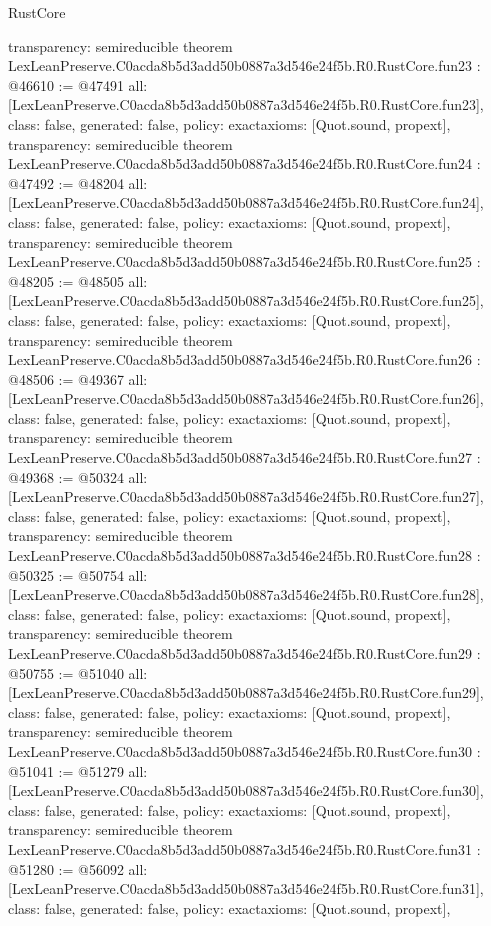 \begin{lexlean}{RustCore}
\begin{coremodule}
{  transparency: semireducible
}
theorem LexLeanPreserve.C0acda8b5d3add50b0887a3d546e24f5b.R0.RustCore.fun23 : @46610 := @47491 {
  all: [LexLeanPreserve.C0acda8b5d3add50b0887a3d546e24f5b.R0.RustCore.fun23],
  class: false,
  generated: false,
  policy: exact{axioms: [Quot.sound, propext]},
  transparency: semireducible
}
theorem LexLeanPreserve.C0acda8b5d3add50b0887a3d546e24f5b.R0.RustCore.fun24 : @47492 := @48204 {
  all: [LexLeanPreserve.C0acda8b5d3add50b0887a3d546e24f5b.R0.RustCore.fun24],
  class: false,
  generated: false,
  policy: exact{axioms: [Quot.sound, propext]},
  transparency: semireducible
}
theorem LexLeanPreserve.C0acda8b5d3add50b0887a3d546e24f5b.R0.RustCore.fun25 : @48205 := @48505 {
  all: [LexLeanPreserve.C0acda8b5d3add50b0887a3d546e24f5b.R0.RustCore.fun25],
  class: false,
  generated: false,
  policy: exact{axioms: [Quot.sound, propext]},
  transparency: semireducible
}
theorem LexLeanPreserve.C0acda8b5d3add50b0887a3d546e24f5b.R0.RustCore.fun26 : @48506 := @49367 {
  all: [LexLeanPreserve.C0acda8b5d3add50b0887a3d546e24f5b.R0.RustCore.fun26],
  class: false,
  generated: false,
  policy: exact{axioms: [Quot.sound, propext]},
  transparency: semireducible
}
theorem LexLeanPreserve.C0acda8b5d3add50b0887a3d546e24f5b.R0.RustCore.fun27 : @49368 := @50324 {
  all: [LexLeanPreserve.C0acda8b5d3add50b0887a3d546e24f5b.R0.RustCore.fun27],
  class: false,
  generated: false,
  policy: exact{axioms: [Quot.sound, propext]},
  transparency: semireducible
}
theorem LexLeanPreserve.C0acda8b5d3add50b0887a3d546e24f5b.R0.RustCore.fun28 : @50325 := @50754 {
  all: [LexLeanPreserve.C0acda8b5d3add50b0887a3d546e24f5b.R0.RustCore.fun28],
  class: false,
  generated: false,
  policy: exact{axioms: [Quot.sound, propext]},
  transparency: semireducible
}
theorem LexLeanPreserve.C0acda8b5d3add50b0887a3d546e24f5b.R0.RustCore.fun29 : @50755 := @51040 {
  all: [LexLeanPreserve.C0acda8b5d3add50b0887a3d546e24f5b.R0.RustCore.fun29],
  class: false,
  generated: false,
  policy: exact{axioms: [Quot.sound, propext]},
  transparency: semireducible
}
theorem LexLeanPreserve.C0acda8b5d3add50b0887a3d546e24f5b.R0.RustCore.fun30 : @51041 := @51279 {
  all: [LexLeanPreserve.C0acda8b5d3add50b0887a3d546e24f5b.R0.RustCore.fun30],
  class: false,
  generated: false,
  policy: exact{axioms: [Quot.sound, propext]},
  transparency: semireducible
}
theorem LexLeanPreserve.C0acda8b5d3add50b0887a3d546e24f5b.R0.RustCore.fun31 : @51280 := @56092 {
  all: [LexLeanPreserve.C0acda8b5d3add50b0887a3d546e24f5b.R0.RustCore.fun31],
  class: false,
  generated: false,
  policy: exact{axioms: [Quot.sound, propext]},
}
\end{coremodule}
\end{lexlean}
